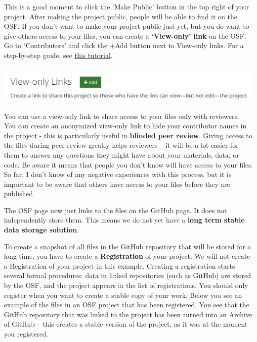 \documentclass[
  oneside]{krantz}
\begin{document}
This is a good moment to click the `Make Public' button in the top right of your
project. After making the project public, people will be able to find it on the
OSF. If you don't want to make your project public just yet, but you do want to
give others access to your files, you can create a \textbf{`View-only' link} on the
OSF. Go to `Contributors' and click the +Add button next to View-only links. For
a step-by-step guide, see \href{https://help.osf.io/hc/en-us/articles/360019930333-Create-a-View-only-Link-for-a-Project}{this
tutorial}.

\begin{center}\includegraphics[width=1\linewidth]{images/fd54022300a51d07de93673aac3fb508} \end{center}

You can use a view-only link to share access to your files only with reviewers. You can create an anonymized view-only link to hide your contributor names in the project - this is particularly useful in \textbf{blinded peer review}. Giving access to the files during peer review greatly helps reviewers -- it will be a lot easier for them to answer any questions they might have about your materials, data, or code. Be aware it means that people you don't know will have access to your files. So far, I don't know of any negative experiences with this process, but it is important to be aware that others have access to your files before they are published.

The OSF page now just links to the files on the GitHub page. It does not independently store them. This means we do not yet have a \textbf{long term stable data storage solution}.

To create a snapshot of all files in the GitHub repository that will be stored for a long time, you have to create a \textbf{Registration} of your project. We will not create a Registration of your project in this example. Creating a registration starts several formal procedures: data in linked repositories (such as GitHub) are stored by the OSF, and the project appears in the list of registrations. You should only register when you want to create a stable copy of your work. Below you see an example of the files in an OSF project that has been registered. You see that the GitHub repository that was linked to the project has been turned into an Archive of GitHub -- this creates a stable version of the project, as it was at the moment you registered.
\end{document}
